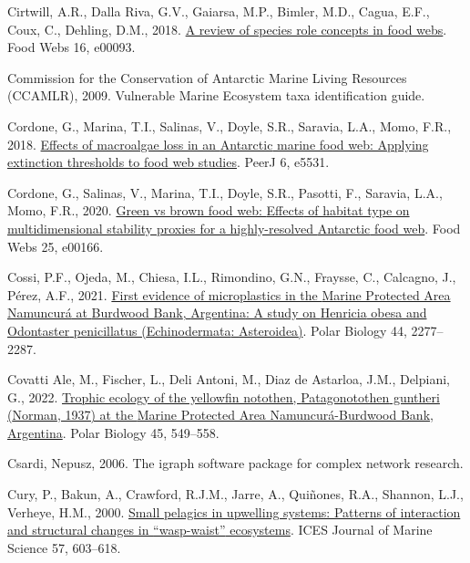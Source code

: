 \documentclass[preprint, 3p,
authoryear]{elsarticle} %
\newlength{\cslhangindent}
\newlength{\cslentryspacingunit} %
\newenvironment{CSLReferences}[2] %
 {%
  \setlength{\parindent}{0pt}
  \ifodd #1
  \let\oldpar\par
  \def\par{\hangindent=\cslhangindent\oldpar}
  \fi
  \setlength{\parskip}{#2\cslentryspacingunit}
 }%
 {}
\begin{document}
\begin{CSLReferences}{1}{0}
\leavevmode{}%
Cirtwill, A.R., Dalla Riva, G.V., Gaiarsa, M.P., Bimler, M.D., Cagua,
E.F., Coux, C., Dehling, D.M., 2018.
\href{https://doi.org/10.1016/j.fooweb.2018.e00093}{A review of species
role concepts in food webs}. Food Webs 16, e00093.

\leavevmode{}%
Commission for the Conservation of Antarctic Marine Living Resources
(CCAMLR), 2009. Vulnerable {Marine Ecosystem} taxa identification guide.

\leavevmode{}%
Cordone, G., Marina, T.I., Salinas, V., Doyle, S.R., Saravia, L.A.,
Momo, F.R., 2018. \href{https://doi.org/10.7717/peerj.5531}{Effects of
macroalgae loss in an {Antarctic} marine food web: Applying extinction
thresholds to food web studies}. PeerJ 6, e5531.

\leavevmode{}%
Cordone, G., Salinas, V., Marina, T.I., Doyle, S.R., Pasotti, F.,
Saravia, L.A., Momo, F.R., 2020.
\href{https://doi.org/10.1016/j.fooweb.2020.e00166}{Green vs brown food
web: {Effects} of habitat type on multidimensional stability proxies for
a highly-resolved {Antarctic} food web}. Food Webs 25, e00166.

\leavevmode{}%
Cossi, P.F., Ojeda, M., Chiesa, I.L., Rimondino, G.N., Fraysse, C.,
Calcagno, J., Pérez, A.F., 2021.
\href{https://doi.org/10.1007/s00300-021-02959-5}{First evidence of
microplastics in the {Marine Protected Area Namuncurá} at {Burdwood
Bank}, {Argentina}: A study on {Henricia} obesa and {Odontaster}
penicillatus ({Echinodermata}: {Asteroidea})}. Polar Biology 44,
2277--2287.

\leavevmode{}%
Covatti Ale, M., Fischer, L., Deli Antoni, M., Diaz de Astarloa, J.M.,
Delpiani, G., 2022.
\href{https://doi.org/10.1007/s00300-022-03011-w}{Trophic ecology of the
yellowfin notothen, {Patagonotothen} guntheri ({Norman}, 1937) at the
{Marine Protected Area Namuncurá-Burdwood Bank}, {Argentina}}. Polar
Biology 45, 549--558.

\leavevmode{}%
Csardi, Nepusz, 2006. The igraph software package for complex network
research.

\leavevmode{}%
Cury, P., Bakun, A., Crawford, R.J.M., Jarre, A., Quiñones, R.A.,
Shannon, L.J., Verheye, H.M., 2000.
\href{https://doi.org/10.1006/jmsc.2000.0712}{Small pelagics in
upwelling systems: Patterns of interaction and structural changes in
{``wasp-waist''} ecosystems}. ICES Journal of Marine Science 57,
603--618.


\end{CSLReferences}
\end{document}
